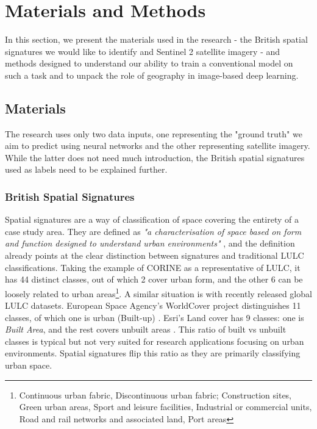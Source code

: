 \section{Materials and Methods}
\label{sec:matmet}

In this section, we present the materials used in the research - the British spatial
signatures we would like to identify and Sentinel 2 satellite
imagery - and methods designed to understand our ability to train a conventional model on
such a task and to unpack the role of geography in image-based deep learning.

\subsection{Materials}

The research uses only two data inputs, one representing the "ground truth" we aim to
predict using neural networks and the other representing satellite
imagery. While the latter does not need much introduction, the British spatial
signatures used as labels need to be explained further.

\subsubsection{British Spatial Signatures}

Spatial signatures are a way of classification of space covering the entirety of a case
study area. They are defined as \textit{"a characterisation of space based on form and
function designed to understand urban environments"} \citep{dab_mf_2021a}, and the
definition already points at the clear distinction between signatures and traditional
LULC classifications. Taking the example of CORINE
\citep{europeanenvironmentagency1990} as a representative of LULC, it has 44 distinct
classes, out of which 2 cover urban form, and the other 6 can be loosely related to urban
areas\footnote{Continuous urban fabric, Discontinuous urban fabric; Construction sites,
Green urban areas, Sport and leisure facilities, Industrial or commercial units, Road
and rail networks and associated land, Port areas}. A similar situation is with recently
released global LULC datasets. European Space Agency's WorldCover project distinguishes
11 classes, of which one is urban (Built-up) \citep{zanaga_daniele_2021_5571936}. Esri's
Land cover has 9 classes: one is \textit{Built Area}, and the rest covers unbuilt
areas \citep{karra2021global}. This ratio of built vs unbuilt classes is typical but not
very suited for research applications focusing on urban environments. Spatial signatures
flip this ratio as they are primarily classifying urban space.

